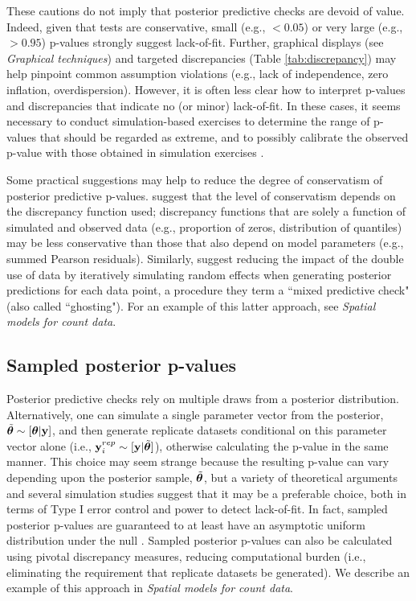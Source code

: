\documentclass[12pt,english]{article}
\begin{document}
\begin{spacing}{1.9}
These cautions do not imply that posterior predictive checks are
devoid of value.  Indeed, given that tests are
conservative, small (e.g., $<0.05$) or very large (e.g., $>0.95$)
p-values strongly suggest lack-of-fit.  Further, graphical displays
(see \textit{Graphical techniques}) and targeted discrepancies (Table
\ref{tab:discrepancy}) may help pinpoint common assumption violations
(e.g., lack of independence, zero inflation, overdispersion).
However, it is often less clear how to interpret p-values and
discrepancies that indicate no (or minor) lack-of-fit. In these cases, it seems
necessary to conduct simulation-based exercises to determine the range
of p-values that should be regarded as extreme, and to possibly
calibrate the observed p-value with those obtained in simulation
exercises \citep[e.g.,][]{DeyEtAl1998,HjortEtAl2006}.

Some practical suggestions may help to reduce the degree of
conservatism of posterior predictive p-values.  \citet{LunnEtAl2013}
suggest that the level of conservatism depends on the discrepancy
function used; discrepancy functions that are solely a function of
simulated and observed data (e.g., proportion of zeros, distribution
of quantiles) may be less conservative than those that also depend on
model parameters (e.g., summed Pearson residuals).  Similarly,
\citet{MarshallSpiegelhalter2003} suggest reducing the impact of the
double use of data by iteratively simulating random effects when
generating posterior predictions for each data point, a procedure they
term a ``mixed predictive check" (also called ``ghosting").  For an
example of this latter approach, see \textit{Spatial models for count
  data}.

\subsection{Sampled posterior p-values}

Posterior predictive checks rely on multiple draws from a posterior distribution. Alternatively, one
can simulate a single parameter vector from the posterior,
$\tilde{\boldsymbol{\theta}} \sim [\boldsymbol{\theta}| {\bf y}]$, and then generate replicate
datasets conditional on this parameter vector alone (i.e.,
${\bf y}_i^{rep} \sim [{\bf y} | \tilde{\boldsymbol{\theta}}]$), otherwise calculating
the p-value in the same manner.  This choice may seem strange because
the resulting p-value can vary depending upon the posterior sample,
$\tilde{\boldsymbol{\theta}}$, but a variety of theoretical arguments
\citep[e.g.,][]{Johnson2004,Johnson2007,YuanJohnson2012,Gosselin2011}
and several simulation studies \citep[e.g.,][]{Gosselin2011,Zhang2014}
suggest that it may be a preferable choice, both in terms of Type I
error control and power to detect lack-of-fit.  In fact, sampled
posterior p-values are guaranteed to at least have an asymptotic
uniform distribution under the null \citep{Gosselin2011}.  Sampled posterior
p-values can also be calculated using pivotal discrepancy measures,
reducing computational burden (i.e., eliminating the requirement that
replicate datasets be generated). We describe an example of this
approach in \textit{Spatial models for count data}.


\end{spacing}
\end{document}
